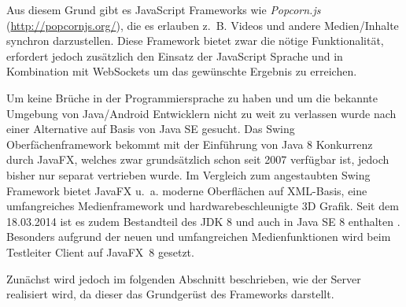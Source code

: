Aus diesem Grund gibt es JavaScript Frameworks wie \emph{Popcorn.js} (\url{http://popcornjs.org/}), die es erlauben z.~B. Videos und andere Medien/Inhalte synchron darzustellen.
Diese Framework bietet zwar die nötige Funktionalität, erfordert jedoch zusätzlich den Einsatz der JavaScript Sprache und in Kombination mit WebSockets um das gewünschte Ergebnis zu erreichen. \cite[Vgl.][]{bocoup.2014}

Um keine Brüche in der Programmiersprache zu haben und um die bekannte Umgebung von Java/Android Entwicklern nicht zu weit zu verlassen wurde nach einer Alternative auf Basis von Java SE gesucht.
Das Swing Oberfächenframework bekommt mit der Einführung von Java 8 Konkurrenz durch JavaFX, welches zwar grundsätzlich schon seit 2007 verfügbar ist, jedoch bisher nur separat vertrieben wurde. 
Im Vergleich zum angestaubten Swing Framework bietet JavaFX u.~a. moderne Oberflächen auf \ac{XML}-Basis, eine umfangreiches Medienframework und hardwarebeschleunigte 3D Grafik.
Seit dem 18.03.2014 ist es zudem Bestandteil des \ac{JDK} 8 und auch in Java SE 8 enthalten \cite[Vgl.][xxiv-xxvi]{Dea.2014}.
Besonders aufgrund der neuen und umfangreichen Medienfunktionen wird beim Testleiter Client auf JavaFX~8 gesetzt.

Zunächst wird jedoch im folgenden Abschnitt beschrieben, wie der Server realisiert wird, da dieser das Grundgerüst des Frameworks darstellt. 